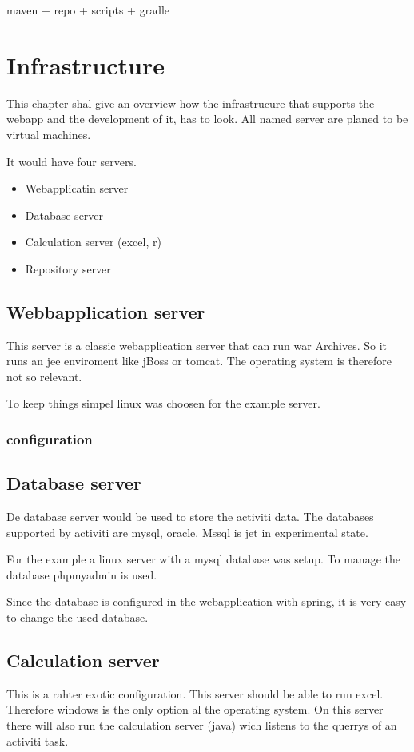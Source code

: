\documentclass[paper=a4,twoside=false,BCOR=0mm,DIV=calc,fontsize=12pt]{scrartcl}
\begin{document}
maven + repo + scripts + gradle


\section{Infrastructure}
This chapter shal give an overview how the infrastrucure that supports the webapp and the development of it, has to look. 
All named server are planed to be virtual machines.

It would have four servers. 
\begin{itemize}
 \item Webapplicatin server
 \item Database server
 \item Calculation server (excel, r)
 \item Repository server
\end{itemize}

\subsection{Webbapplication server}
This server is a classic webapplication server that can run war Archives. 
So it runs an jee enviroment like jBoss or tomcat.
The operating system is therefore not so relevant. 

To keep things simpel linux was choosen for the example server.

\subsubsection{configuration}


\subsection{Database server}
De database server would be used to store the activiti data. The databases supported by activiti are mysql, oracle. Mssql is jet in experimental state.
 
For the example a linux server with a mysql database was setup.
To manage the database phpmyadmin is used.

Since the database is configured in the webapplication with spring, it is very easy to change the used database.


\subsection{Calculation server}
This is a rahter exotic configuration. This server should be able to run excel. Therefore windows is the only option al the operating system. On this server there will also run the calculation server (java) wich listens to the querrys of an activiti task.
\end{document}
